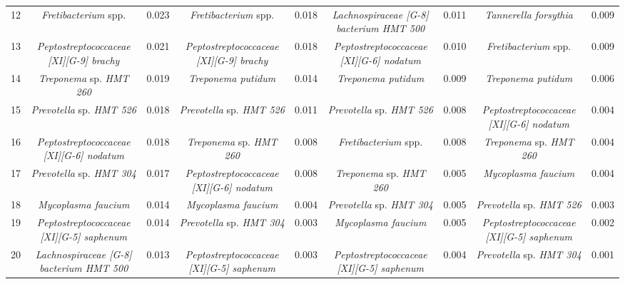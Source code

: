 \begin{tabular}{c|cc|cc|cc|cc}
    12 & \textit{Fretibacterium} spp. & 0.023 & \textit{Fretibacterium} spp. & 0.018 & \textit{Lachnospiraceae [G-8] bacterium HMT 500} & 0.011 & \textit{Tannerella forsythia} & 0.009 \\
    13 & \textit{Peptostreptococcaceae [XI][G-9] brachy} & 0.021 & \textit{Peptostreptococcaceae [XI][G-9] brachy} & 0.018 & \textit{Peptostreptococcaceae [XI][G-6] nodatum} & 0.010 & \textit{Fretibacterium} spp. & 0.009 \\
    14 & \textit{Treponema} sp. \textit{HMT 260} & 0.019 & \textit{Treponema putidum} & 0.014 & \textit{Treponema putidum} & 0.009 & \textit{Treponema putidum} & 0.006 \\
    15 & \textit{Prevotella} sp. \textit{HMT 526} & 0.018 & \textit{Prevotella} sp. \textit{HMT 526} & 0.011 & \textit{Prevotella} sp. \textit{HMT 526} & 0.008 & \textit{Peptostreptococcaceae [XI][G-6] nodatum} & 0.004 \\
    16 & \textit{Peptostreptococcaceae [XI][G-6] nodatum} & 0.018 & \textit{Treponema} sp. \textit{HMT 260} & 0.008 & \textit{Fretibacterium} spp. & 0.008 & \textit{Treponema} sp. \textit{HMT 260} & 0.004 \\
    17 & \textit{Prevotella} sp. \textit{HMT 304} & 0.017 & \textit{Peptostreptococcaceae [XI][G-6] nodatum} & 0.008 & \textit{Treponema} sp. \textit{HMT 260} & 0.005 & \textit{Mycoplasma faucium} & 0.004 \\
    18 & \textit{Mycoplasma faucium} & 0.014 & \textit{Mycoplasma faucium} & 0.004 & \textit{Prevotella} sp. \textit{HMT 304} & 0.005 & \textit{Prevotella} sp. \textit{HMT 526} & 0.003 \\
    19 & \textit{Peptostreptococcaceae [XI][G-5] saphenum} & 0.014 & \textit{Prevotella} sp. \textit{HMT 304} & 0.003 & \textit{Mycoplasma faucium} & 0.005 & \textit{Peptostreptococcaceae [XI][G-5] saphenum} & 0.002 \\
    20 & \textit{Lachnospiraceae [G-8] bacterium HMT 500} & 0.013 & \textit{Peptostreptococcaceae [XI][G-5] saphenum} & 0.003 & \textit{Peptostreptococcaceae [XI][G-5] saphenum} & 0.004 & \textit{Prevotella} sp. \textit{HMT 304} & 0.001 \\
\end{tabular}
